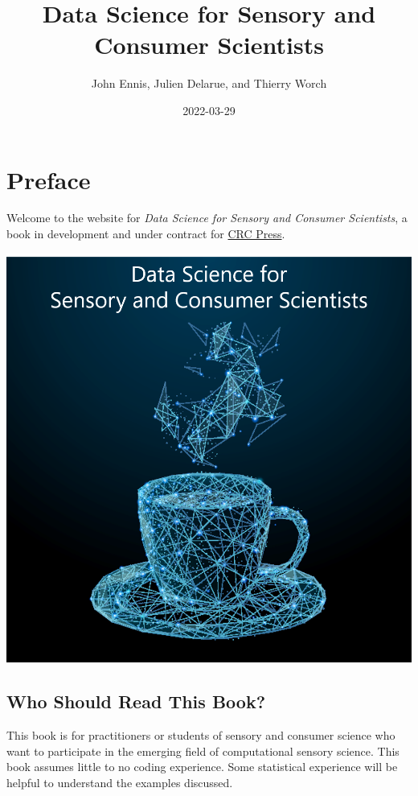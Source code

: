 \documentclass[
]{book}
\title{Data Science for Sensory and Consumer Scientists}
\author{John Ennis, Julien Delarue, and Thierry Worch}
\date{2022-03-29}
\begin{document}
\maketitle

{
\setcounter{tocdepth}{1}
\tableofcontents
}
\hypertarget{preface}{%
\chapter*{Preface}\label{preface}}

Welcome to the website for \emph{Data Science for Sensory and Consumer Scientists}, a book in development and under contract for \href{https://www.routledge.com/}{CRC Press}.

\begin{center}\includegraphics[width=13.44in]{images/cover_art} \end{center}

\hypertarget{who-should-read-this-book}{%
\section*{Who Should Read This Book?}\label{who-should-read-this-book}}

This book is for practitioners or students of sensory and consumer science who want to participate in the emerging field of computational sensory science. This book assumes little to no coding experience. Some statistical experience will be helpful to understand the examples discussed.
\end{document}
